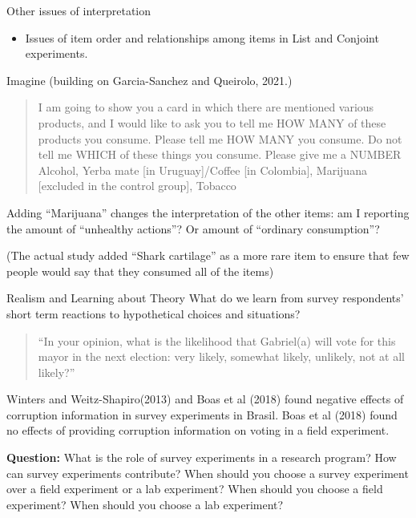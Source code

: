 \documentclass[
  ignorenonframetext,
]{beamer}
\providecommand{\tightlist}{%
  \setlength{\itemsep}{0pt}\setlength{\parskip}{0pt}}
\begin{document}
\begin{frame}[allowframebreaks]{Other issues of interpretation}
\protect\hypertarget{other-issues-of-interpretation-2}{}
\begin{itemize}
\tightlist
\item
  Issues of item order and relationships among items in List and
  Conjoint experiments.
\end{itemize}

Imagine (building on Garcia-Sanchez and Queirolo, 2021.)

\begin{quote}
I am going to show you a card in which there are mentioned various
products, and I would like to ask you to tell me HOW MANY of these
products you consume. Please tell me HOW MANY you consume. Do not tell
me WHICH of these things you consume. Please give me a NUMBER Alcohol,
Yerba mate {[}in Uruguay{]}/Coffee {[}in Colombia{]}, Marijuana
{[}excluded in the control group{]}, Tobacco
\end{quote}

Adding ``Marijuana'' changes the interpretation of the other items: am I
reporting the amount of ``unhealthy actions''? Or amount of ``ordinary
consumption''?

(The actual study added ``Shark cartilage'' as a more rare item to
ensure that few people would say that they consumed all of the items)
\end{frame}

\begin{frame}{Realism and Learning about Theory}
\protect\hypertarget{realism-and-learning-about-theory}{}
What do we learn from survey respondents' short term reactions to
hypothetical choices and situations?

\begin{quote}
``In your opinion, what is the likelihood that Gabriel(a) will vote for
this mayor in the next election: very likely, somewhat likely, unlikely,
not at all likely?''
\end{quote}

Winters and Weitz-Shapiro(2013) and Boas et al (2018) found negative
effects of corruption information in survey experiments in Brasil. Boas
et al (2018) found no effects of providing corruption information on
voting in a field experiment.

\medskip

\textbf{Question:} What is the role of survey experiments in a research
program? How can survey experiments contribute? When should you choose a
survey experiment over a field experiment or a lab experiment? When
should you choose a field experiment? When should you choose a lab
experiment?
\end{frame}
\end{document}
